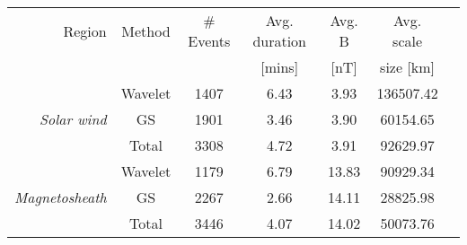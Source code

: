 \begin{tabular}{rcccccc}
\hline
Region &   Method &  \# Events &  Avg. duration &  Avg. B &  Avg. scale \\
 &    &   &  [mins] &  [nT] &  size [km] \\
\hline
         	         & Wavelet & 1407 & 6.43 & 3.93  & 136507.42 \\
\textit{Solar wind} 	  & GS 	    & 1901 & 3.46 & 3.90  & 60154.65 \\
         	           & Total   & 3308 & 4.72 & 3.91  & 92629.97 \\
\hline
         	         & Wavelet & 1179 & 6.79 & 13.83 & 90929.34 \\
\textit{Magnetosheath}    & GS      & 2267 & 2.66 & 14.11 & 28825.98 \\
         	         & Total   & 3446 & 4.07 & 14.02 & 50073.76 \\
\hline
\end{tabular}
